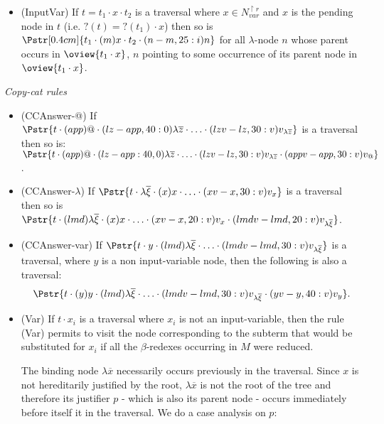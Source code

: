 \begin{dfn}
\begin{itemize}
\item (InputVar)
If $t = t_1 \cdot x \cdot t_2$ is a traversal where $x \in
N_{var}^{\upharpoonright r}$ and $x$ is the pending node in $t$
(i.e. $?(t)=?(t_1) \cdot x$) then so is $\Pstr[0.4cm]{t_1 \cdot
(m){x} \cdot t_2 \cdot (n-m,25:i){n}}$ for all $\lambda$-node
$n$ whose parent occurs in $\oview{t_1 \cdot x}$, $n$ pointing
to some occurrence of its parent node in $\oview{t_1 \cdot x}$.
\end{itemize}

\emph{Copy-cat rules}
\begin{itemize}
  \item (CCAnswer-@)
  If $\Pstr{t \cdot (app){@} \cdot (lz-app,40:0){\lambda
              \overline{z}} \cdot \ldots \cdot
              (lzv-lz,30:v){v_{\lambda \overline{z}}}}$ is a
              traversal then so is: $\Pstr{t \cdot (app){@}
              \cdot (lz-app:40,0){\lambda \overline{z}} \cdot
              \ldots \cdot (lzv-lz,30:v){v_{\lambda
              \overline{z}}} \cdot (appv-app,30:v){v_@}}$.


  \item (CCAnswer-$\lambda$) If $\Pstr{t \cdot \lambda \overline{\xi} \cdot (x){x} \cdot \ldots \cdot (xv-x,30:v){v_x}}$ is a traversal then so is
   $\Pstr{ t \cdot (lmd){\lambda \overline{\xi}} \cdot (x){x}
              \cdot \ldots \cdot (xv-x,20:v){v_x} \cdot
              (lmdv-lmd,20:v){v_{\lambda \overline{\xi}}}}$.

     \item (CCAnswer-var) If $\Pstr{t \cdot y \cdot (lmd){\lambda \overline{\xi}}
                   \cdot \ldots \cdot (lmdv-lmd,30:v){v_{\lambda
                   \overline{\xi}}}}$ is a traversal, where $y$
                   is a non input-variable node, then the
                   following is also a traversal:
        $$\Pstr{ t \cdot (y){y}
            \cdot (lmd){\lambda \overline{\xi}}
            \cdot \ldots
            \cdot (lmdv-lmd,30:v){v_{\lambda \overline{\xi}}}
            \cdot (yv-y,40:v){v_y}}.$$


\item (Var)
If $t \cdot x_i$ is a traversal where $x_i$ is not an input-variable,
then the rule (Var) permits to visit the node corresponding to the subterm that would be substituted
for $x_i$ if all the $\beta$-redexes occurring in $M$ were reduced.

The binding node $\lambda \overline{x}$ necessarily occurs previously
in the traversal. Since $x$ is not hereditarily justified by the
root, $\lambda \overline{x}$ is not the root of the tree and
therefore its justifier $p$ - which is also its parent node - occurs
immediately before itself it in the traversal. We do a case analysis
on $p$:


\end{itemize}
\end{dfn}

